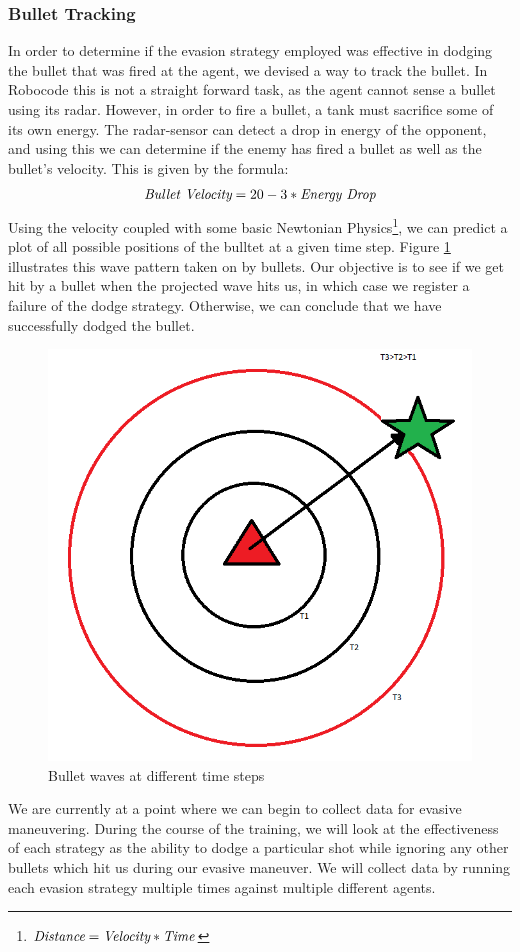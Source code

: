 \documentclass{article}
\theoremstyle{plain}
\theoremstyle{definition}
\theoremstyle{remark}
\begin{document}
\subsubsection*{Bullet Tracking}
In order to determine if the evasion strategy employed was effective in dodging the bullet that was fired at the agent, we devised a way to track the bullet. In Robocode this is not a straight forward task, as the agent cannot sense a bullet using its radar. However, in order to fire a bullet, a tank must sacrifice some of its own energy. The radar-sensor can detect a drop in energy of the opponent, and using this we can determine if the enemy has fired a bullet as well as the bullet's velocity. This is given by the formula:
$$\emph{Bullet Velocity} = 20 - 3 * \emph{Energy Drop}$$
Using the velocity coupled with some basic Newtonian Physics\footnote{$\emph{Distance} = \emph{Velocity} * \emph{Time}$}, we can predict a plot of all possible positions of the bulltet at a given time step.
Figure \ref{b_wave} illustrates this wave pattern taken on by bullets. Our objective is to see if we get hit by a bullet when the projected wave hits us, in which case we register a failure of the dodge strategy. Otherwise, we can conclude that we have successfully dodged the bullet.

\begin{figure}[h]
	\centering
		\includegraphics[width=5 cm]{bullet_wave.png}
	\caption{Bullet waves at different time steps}
	\label{b_wave}
\end{figure}

We are currently at a point where we can begin to collect data for evasive maneuvering. During the course of the training, we will look at the effectiveness of each strategy as the ability to dodge a particular shot while ignoring any other bullets which hit us during our evasive maneuver. We will collect data by running each evasion strategy multiple times against multiple different agents. 
\end{document}
